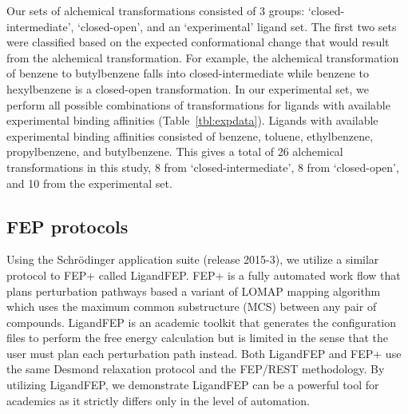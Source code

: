 Our sets of alchemical transformations consisted of 3 groups: `closed-intermediate', `closed-open', and an `experimental' ligand set.
The first two sets were classified based on the expected conformational change that would result from the alchemical transformation.
For example, the alchemical transformation of benzene to butylbenzene falls into closed-intermediate while benzene to hexylbenzene is a closed-open transformation.
In our experimental set, we perform all possible combinations of transformations for ligands with available experimental binding affinities (Table~\ref{tbl:expdata}).
Ligands with available experimental binding affinities consisted of benzene, toluene, ethylbenzene, propylbenzene, and butylbenzene.
This gives a total of 26 alchemical transformations in this study, 8 from `closed-intermediate', 8 from `closed-open', and 10 from the experimental set.

\subsection{FEP protocols}
Using the Schr\"{o}dinger application suite (release 2015-3)\cite{Maestro-Desmond}, we utilize a similar protocol to FEP+\cite{FEPplus} called LigandFEP\cite{LigandFEP}.
FEP+ is a fully automated work flow that plans perturbation pathways based a variant of LOMAP\cite{LOMAP} mapping algorithm which uses the maximum common substructure (MCS) between any pair of compounds.
LigandFEP is an academic toolkit that generates the configuration files to perform the free energy calculation but is limited in the sense that the user must plan each perturbation path instead.
Both LigandFEP and FEP+ use the same Desmond relaxation protocol and the FEP/REST methodology\cite{REST,REST2,FEP/REST,FEP/RESTapp}.
By utilizing LigandFEP, we demonstrate LigandFEP can be a powerful tool for academics as it strictly differs only in the level of automation.

